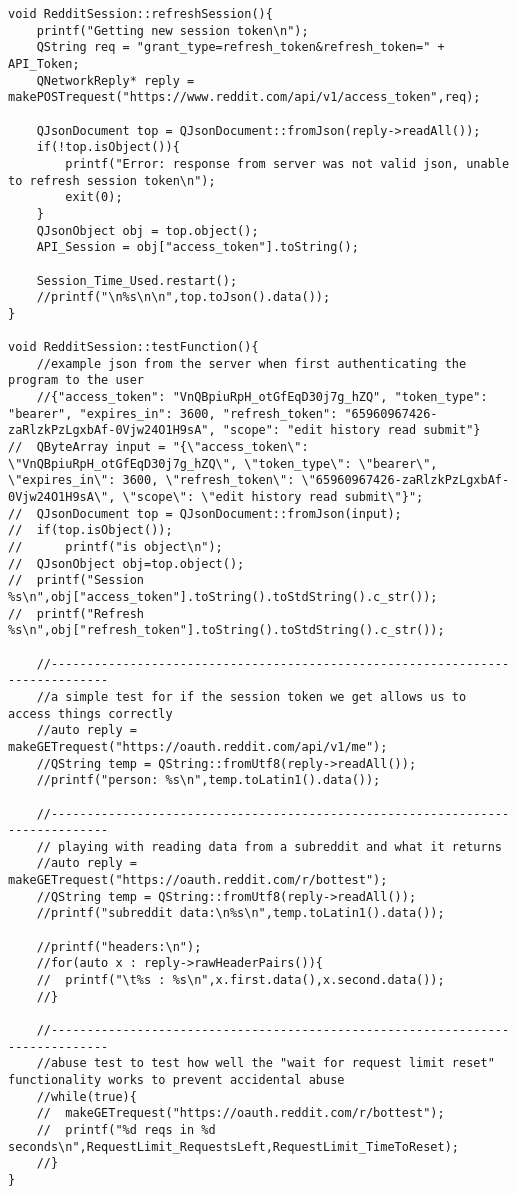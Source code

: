 \documentclass[12pt]{article}
\begin{document}
\begin{verbatim}
void RedditSession::refreshSession(){
	printf("Getting new session token\n");
	QString req = "grant_type=refresh_token&refresh_token=" + API_Token;
	QNetworkReply* reply = makePOSTrequest("https://www.reddit.com/api/v1/access_token",req);

	QJsonDocument top = QJsonDocument::fromJson(reply->readAll());
	if(!top.isObject()){
		printf("Error: response from server was not valid json, unable to refresh session token\n");
		exit(0);
	}
	QJsonObject obj = top.object();
	API_Session = obj["access_token"].toString();

	Session_Time_Used.restart();
	//printf("\n%s\n\n",top.toJson().data());
}

void RedditSession::testFunction(){
	//example json from the server when first authenticating the program to the user
	//{"access_token": "VnQBpiuRpH_otGfEqD30j7g_hZQ", "token_type": "bearer", "expires_in": 3600, "refresh_token": "65960967426-zaRlzkPzLgxbAf-0Vjw24O1H9sA", "scope": "edit history read submit"}
//	QByteArray input = "{\"access_token\": \"VnQBpiuRpH_otGfEqD30j7g_hZQ\", \"token_type\": \"bearer\", \"expires_in\": 3600, \"refresh_token\": \"65960967426-zaRlzkPzLgxbAf-0Vjw24O1H9sA\", \"scope\": \"edit history read submit\"}";
//	QJsonDocument top = QJsonDocument::fromJson(input);
//	if(top.isObject());
//		printf("is object\n");
//	QJsonObject obj=top.object();
//	printf("Session %s\n",obj["access_token"].toString().toStdString().c_str());
//	printf("Refresh %s\n",obj["refresh_token"].toString().toStdString().c_str());

	//------------------------------------------------------------------------------
	//a simple test for if the session token we get allows us to access things correctly
	//auto reply = makeGETrequest("https://oauth.reddit.com/api/v1/me");
	//QString temp = QString::fromUtf8(reply->readAll());
	//printf("person: %s\n",temp.toLatin1().data());

	//------------------------------------------------------------------------------
	// playing with reading data from a subreddit and what it returns
	//auto reply = makeGETrequest("https://oauth.reddit.com/r/bottest");
	//QString temp = QString::fromUtf8(reply->readAll());
	//printf("subreddit data:\n%s\n",temp.toLatin1().data());

	//printf("headers:\n");
	//for(auto x : reply->rawHeaderPairs()){
	//	printf("\t%s : %s\n",x.first.data(),x.second.data());
	//}

	//------------------------------------------------------------------------------
	//abuse test to test how well the "wait for request limit reset" functionality works to prevent accidental abuse
	//while(true){
	//	makeGETrequest("https://oauth.reddit.com/r/bottest");
	//	printf("%d reqs in %d seconds\n",RequestLimit_RequestsLeft,RequestLimit_TimeToReset);
	//}
}


\end{verbatim}
\end{document}
